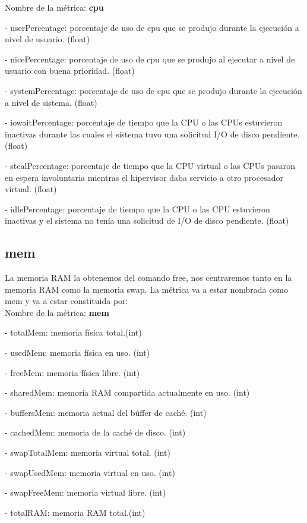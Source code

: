 \documentclass[ spanish, a4paper, 12pt, oneside]{report}
\begin{document}
Nombre de la métrica: \textbf{cpu}

\hyp{} userPercentage: porcentaje de uso de cpu que se produjo durante la ejecución a nivel de usuario. (float)

\hyp{} nicePercentage: porcentaje de uso de cpu que se produjo al ejecutar a nivel de usuario con buena prioridad. (float)

\hyp{} systemPercentage: porcentaje de uso de cpu que se produjo durante la ejecución a nivel de sistema. (float) 

\hyp{} iowaitPercentage: porcentaje de tiempo que la CPU o las CPUs estuvieron inactivas durante las cuales el sistema tuvo una solicitud I/O de disco pendiente. (float)

\hyp{} stealPercentage: porcentaje de tiempo que la CPU virtual o las CPUs pasaron en espera involuntaria mientras el hipervisor daba servicio a otro procesador virtual. (float)

\hyp{} idlePercentage: porcentaje de tiempo que la CPU o las CPU estuvieron inactivas y el sistema no tenía una solicitud de I/O de disco pendiente. (float)

\subsection{mem}
La memoria RAM la obtenemos del comando free, nos centraremos tanto en la memoria RAM
como la memoria swap. La métrica va a estar nombrada como mem y va a estar constituida por:\\

Nombre de la métrica: \textbf{mem}

\hyp{} totalMem: memoria física total.(int)

\hyp{} usedMem: memoria física en uso. (int)

\hyp{} freeMem: memoria física libre. (int)

\hyp{} sharedMem: memoria RAM compartida actualmente en uso. (int)

\hyp{} buffersMem: memoria actual del búffer de caché. (int)

\hyp{} cachedMem: memoria de la caché de disco. (int)

\hyp{} swapTotalMem: memoria virtual total. (int)

\hyp{} swapUsedMem: memoria virtual en uso. (int)

\hyp{} swapFreeMem: memoria virtual libre. (int)

\hyp{} totalRAM: memoria RAM total.(int)
\end{document}
